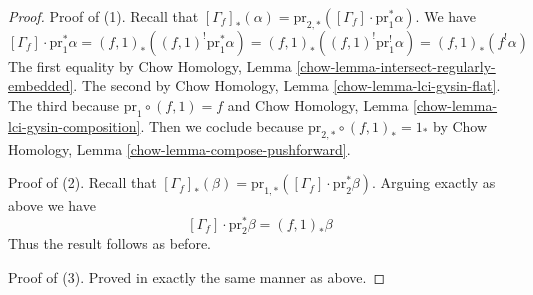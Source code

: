 \documentclass[10pt,a4paper]{amsart}
\theoremstyle{plain}
\theoremstyle{definition}
\theoremstyle{remark}
\numberwithin{equation}{subsection}
\begin{document}
\begin{proof}
Proof of (1). Recall that
$[\Gamma_f]_*(\alpha) =
\text{pr}_{2, *}([\Gamma_f] \cdot \text{pr}_1^*\alpha)$.
We have
$$
[\Gamma_f] \cdot \text{pr}_1^*\alpha =
(f, 1)_*((f, 1)^! \text{pr}_1^*\alpha) =
(f, 1)_*((f, 1)^! \text{pr}_1^!\alpha) =
(f, 1)_*(f^!\alpha)
$$
The first equality by Chow Homology, Lemma
\ref{chow-lemma-intersect-regularly-embedded}.
The second by 
Chow Homology, Lemma \ref{chow-lemma-lci-gysin-flat}.
The third because $\text{pr}_1 \circ (f, 1) = f$ and
Chow Homology, Lemma \ref{chow-lemma-lci-gysin-composition}.
Then we coclude because
$\text{pr}_{2, *} \circ (f, 1)_* = 1_*$ by
Chow Homology, Lemma \ref{chow-lemma-compose-pushforward}.

\medskip\noindent
Proof of (2). Recall that $[\Gamma_f]_*(\beta) =
\text{pr}_{1, *}([\Gamma_f] \cdot \text{pr}_2^*\beta)$.
Arguing exactly as above we have
$$
[\Gamma_f] \cdot \text{pr}_2^*\beta = (f, 1)_*\beta
$$
Thus the result follows as before.

\medskip\noindent
Proof of (3). Proved in exactly the same manner as above.
\end{proof}
\end{document}
